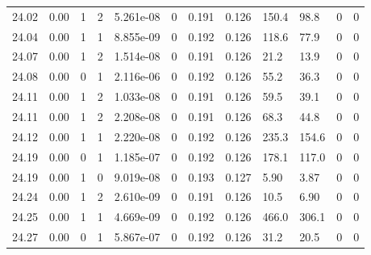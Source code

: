 \documentclass[preview]{standalone}
\begin{document}
{{{{{{{{{{{{{{{{{{{\begin{tabular}{L{1.2cm}C{1.2cm} C{0.3cm}C{0.5cm} C{1.4cm}C{1.4cm} C{1.4cm}C{1.4cm} C{1.6cm}C{1.6cm} C{1.6cm}C{1.6cm}}
  24.02  &  0.00  & 1     &  2 &  5.261e-08  & 0  &  0.191&   0.126& 150.4 & 98.8   &  0 & 0  \\ 
  24.04  &  0.00  & 1     &  1 &  8.855e-09  & 0  &  0.192&   0.126& 118.6 & 77.9   &  0 & 0  \\ 
  24.07  &  0.00  & 1     &  2 &  1.514e-08  & 0  &  0.191&   0.126& 21.2 & 13.9   &  0 & 0  \\ 
  24.08  &  0.00  & 0     &  1 &  2.116e-06  & 0  &  0.192&   0.126& 55.2 & 36.3   &  0 & 0  \\ 
  24.11  &  0.00  & 1     &  2 &  1.033e-08  & 0  &  0.191&   0.126& 59.5 & 39.1   &  0 & 0  \\ 
  24.11  &  0.00  & 1     &  2 &  2.208e-08  & 0  &  0.191&   0.126& 68.3 & 44.8   &  0 & 0  \\ 
  24.12  &  0.00  & 1     &  1 &  2.220e-08  & 0  &  0.192&   0.126& 235.3 & 154.6   &  0 & 0  \\ 
  24.19  &  0.00  & 0     &  1 &  1.185e-07  & 0  &  0.192&   0.126& 178.1 & 117.0   &  0 & 0  \\ 
  24.19  &  0.00  & 1     &  0 &  9.019e-08  & 0  &  0.193&   0.127& 5.90 & 3.87   &  0 & 0  \\ 
  24.24  &  0.00  & 1     &  2 &  2.610e-09  & 0  &  0.191&   0.126& 10.5 & 6.90   &  0 & 0  \\ 
  24.25  &  0.00  & 1     &  1 &  4.669e-09  & 0  &  0.192&   0.126& 466.0 & 306.1   &  0 & 0  \\ 
  24.27  &  0.00  & 0     &  1 &  5.867e-07  & 0  &  0.192&   0.126& 31.2 & 20.5   &  0 & 0  \\ 
\hline 
\end{tabular} 

}}}}}}}}}}}}}}}}}}}
\end{document}
